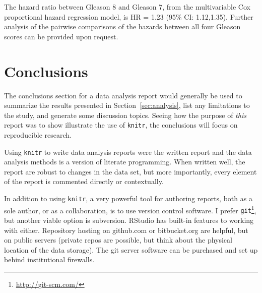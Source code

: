 \documentclass[letterpaper, 10pt]{article}\usepackage[]{graphicx}\usepackage[]{color}
\begin{document}
The hazard ratio between Gleason 8 and Gleason 7, from the multivariable Cox
proportional hazard regression model, is 
HR = 1.23 (95\% CI: 1.12,1.35).  
Further analysis of the pairwise comparisons of the hazards between all
four Gleason scores can be provided upon request.


\section{Conclusions \label{sec:conclusions}} %
The conclusions section for a data analysis report would generally be used to
summarize the results presented in Section~\ref{sec:analysis}, list any
limitations to the study, and generate some discussion topics.  Seeing how the
purpose of {\it this} report was to show illustrate the use of {\tt knitr}, the
conclusions will focus on reproducible research.

Using {\tt knitr} to write data analysis reports were the written report and the
data analysis methods is a version of literate programming.  When written well,
the report are robust to changes in the data set, but more importantly, every
element of the report is commented directly or contextually.  

In addition to using {\tt knitr}, a very powerful tool for authoring reports,
both as a sole author, or as a collaboration, is to use version control
software.  I prefer {\tt git}\footnote{\url{http://git-scm.com/}}, but another
viable option is subversion.  RStudio has built-in features to working with
either.  Repository hosting on github.com or bitbucket.org are helpful, but on
public servers (private repos are possible, but think about the physical
location of the data storage).  The git server software can be purchased and set
up behind institutional firewalls.  









\appendix
\end{document}
